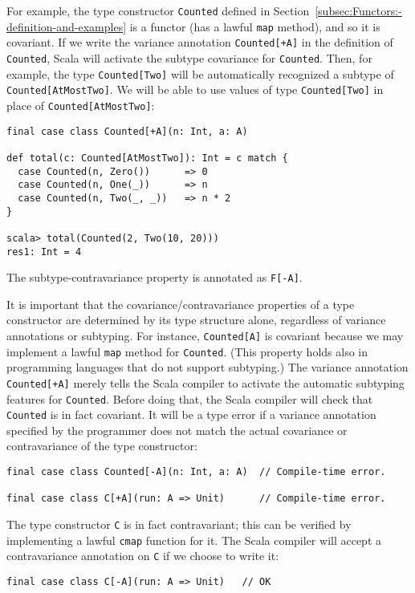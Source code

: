 For example, the type constructor \lstinline!Counted! defined in
Section~\ref{subsec:Functors:-definition-and-examples} is a functor
(has a lawful \lstinline!map! method), and so it is covariant. If
we write the variance annotation \lstinline!Counted[+A]! in the definition
of \lstinline!Counted!, Scala will activate the subtype covariance
for \lstinline!Counted!. Then, for example, the type \lstinline!Counted[Two]!
will be automatically recognized a subtype of \lstinline!Counted[AtMostTwo]!.
We will be able to use values of type \lstinline!Counted[Two]! in
place of \lstinline!Counted[AtMostTwo]!:
\begin{lstlisting}
final case class Counted[+A](n: Int, a: A)

def total(c: Counted[AtMostTwo]): Int = c match {
  case Counted(n, Zero())      => 0
  case Counted(n, One(_))      => n
  case Counted(n, Two(_, _))   => n * 2
}

scala> total(Counted(2, Two(10, 20)))
res1: Int = 4
\end{lstlisting}

The subtype-contravariance property is annotated as \lstinline!F[-A]!.

It is important that the covariance/contravariance properties of a
type constructor are determined by its type structure alone, regardless
of variance annotations or subtyping. For instance, \lstinline!Counted[A]!
is covariant because we may implement a lawful \lstinline!map! method
for \lstinline!Counted!. (This property holds also in programming
languages that do not support subtyping.) The variance annotation
\lstinline!Counted[+A]! merely tells the Scala compiler to activate
the automatic subtyping features for \lstinline!Counted!. Before
doing that, the Scala compiler will check that \lstinline!Counted!
is in fact covariant. It will be a type error if a variance annotation
specified by the programmer does not match the actual covariance or
contravariance of the type constructor:
\begin{lstlisting}
final case class Counted[-A](n: Int, a: A)  // Compile-time error.

final case class C[+A](run: A => Unit)      // Compile-time error.
\end{lstlisting}
The type constructor \lstinline!C! is in fact contravariant; this
can be verified by implementing a lawful \lstinline!cmap! function
for it. The Scala compiler will accept a contravariance annotation
on \lstinline!C! if we choose to write it:
\begin{lstlisting}
final case class C[-A](run: A => Unit)   // OK
\end{lstlisting}

